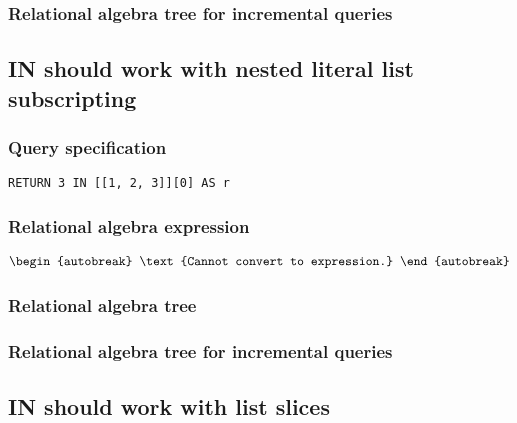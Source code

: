 
\subsubsection*{Relational algebra tree for incremental queries}


\subsection{IN should work with nested literal list subscripting}

\subsubsection*{Query specification}

\begin{lstlisting}
RETURN 3 IN [[1, 2, 3]][0] AS r
\end{lstlisting}

\subsubsection*{Relational algebra expression}

\begin{align*}
\begin{autobreak}
\text{Cannot convert to expression.}
\end{autobreak}
\end{align*}

\subsubsection*{Relational algebra tree}


\subsubsection*{Relational algebra tree for incremental queries}


\subsection{IN should work with list slices}

